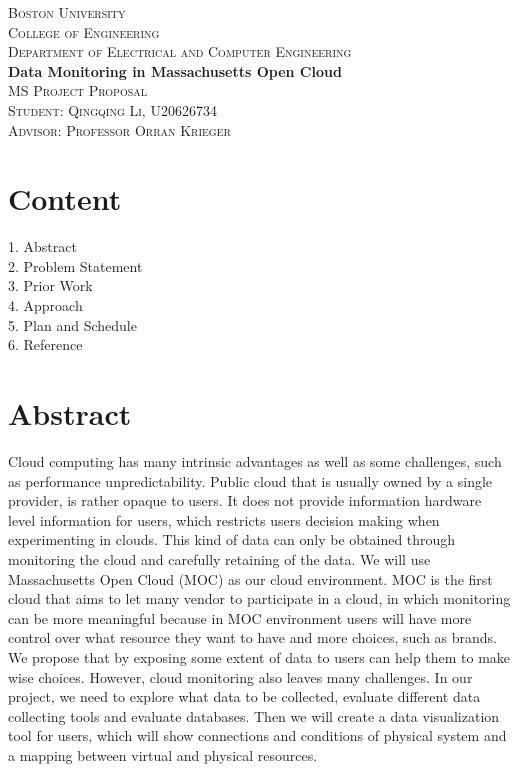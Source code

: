 \documentclass[11pt, oneside]{article}   	%
\begin{document}
\begin{titlepage}
	\begin{center}
	\textsc{\LARGE Boston University}\\
	[5mm]
	\textsc{\Large College of Engineering}\\
	[5mm]
	\textsc{\Large Department of Electrical and Computer Engineering}\\
	[2cm]
	\huge{\bfseries Data Monitoring in Massachusetts Open Cloud}\\
	[2cm]
	\textsc{\large MS Project Proposal}\\
	[2cm]
	\textsc{\large Student: Qingqing Li, U20626734}\\
	[5mm]
	\textsc{\large Advisor: Professor Orran Krieger}\\
	[5mm]
	
	
	\end{center}
	
\end{titlepage}

\section{Content}\label{sec: content}
1. Abstract\\
2. Problem Statement\\
3. Prior Work\\
4. Approach\\
5. Plan and Schedule\\
6. Reference\\

\section{Abstract}\label{sec:abstract}

Cloud computing has many intrinsic advantages  as well as some challenges, such as performance unpredictability. Public cloud that is usually owned by a single provider, is rather opaque to users. It does not provide information hardware level information for users, which restricts users decision making when experimenting in clouds. This kind of data can only be obtained through monitoring the cloud and carefully retaining of the data. We will use Massachusetts Open Cloud (MOC) as our cloud environment. MOC is the first cloud that aims to let many vendor to participate in a cloud, in which monitoring can be more meaningful because in MOC environment users will have more control over what resource they want to have and more choices, such as brands. We propose that by exposing some extent of data to users can help them to make wise choices. However, cloud monitoring also leaves many challenges. In our project, we need to explore what data to be collected, evaluate different data collecting tools and evaluate databases. Then we will create a data visualization tool for users, which will show connections and conditions of physical system and a mapping between virtual and physical resources.
\end{document}

